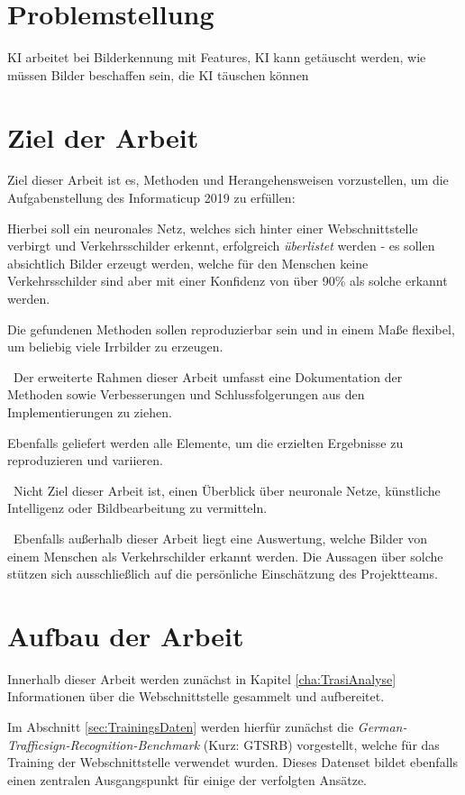 \section{Problemstellung}
KI arbeitet bei Bilderkennung mit Features, KI kann getäuscht werden, wie müssen Bilder beschaffen sein, die KI täuschen können

\section{Ziel der Arbeit}
\label{sec:ZielDerArbeit}
Ziel dieser Arbeit ist es, Methoden und Herangehensweisen vorzustellen, um die Aufgabenstellung des Informaticup 2019  zu erfüllen: 

Hierbei soll ein neuronales Netz, welches sich hinter einer Webschnittstelle verbirgt und Verkehrsschilder erkennt, erfolgreich \textit{überlistet} werden - es sollen absichtlich Bilder erzeugt werden, welche für den Menschen keine Verkehrsschilder sind aber mit einer Konfidenz von über 90\% als solche erkannt werden. 

Die gefundenen Methoden sollen reproduzierbar sein und in einem Maße flexibel, um beliebig viele Irrbilder zu erzeugen. 

~\newline Der erweiterte Rahmen dieser Arbeit umfasst eine Dokumentation der Methoden sowie Verbesserungen und Schlussfolgerungen aus den Implementierungen zu ziehen. 

Ebenfalls geliefert werden alle Elemente, um die erzielten Ergebnisse zu reproduzieren und variieren. 

~\newline Nicht Ziel dieser Arbeit ist, einen Überblick über neuronale Netze, künstliche Intelligenz oder Bildbearbeitung zu vermitteln. 

~\newline Ebenfalls außerhalb dieser Arbeit liegt eine Auswertung, welche Bilder von einem Menschen als Verkehrschilder erkannt werden. Die Aussagen über solche stützen sich ausschließlich auf die persönliche Einschätzung des Projektteams. 
\section{Aufbau der Arbeit}
Innerhalb dieser Arbeit werden zunächst in Kapitel \ref{cha:TrasiAnalyse} Informationen über die Webschnittstelle gesammelt und aufbereitet. 

Im Abschnitt \ref{sec:TrainingsDaten} werden hierfür zunächst die \textit{German-Trafficsign-Recognition-Benchmark} (Kurz: GTSRB) vorgestellt, welche für das Training der Webschnittstelle verwendet wurden. Dieses Datenset bildet ebenfalls einen zentralen Ausgangspunkt für einige der verfolgten Ansätze.

